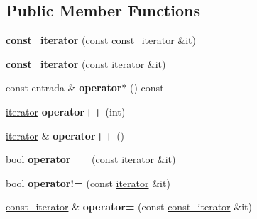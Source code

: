 \subsection*{Public Member Functions}
\begin{DoxyCompactItemize}
\item 
\hypertarget{classdiccionario_1_1const__iterator_a86b806648b2290cdba113a0e104ec03b}{{\bfseries const\-\_\-iterator} (const \hyperlink{classdiccionario_1_1const__iterator}{const\-\_\-iterator} \&it)}\label{classdiccionario_1_1const__iterator_a86b806648b2290cdba113a0e104ec03b}

\item 
\hypertarget{classdiccionario_1_1const__iterator_aefc3badb3cd84f14232a9bca4305ef3c}{{\bfseries const\-\_\-iterator} (const \hyperlink{classdiccionario_1_1iterator}{iterator} \&it)}\label{classdiccionario_1_1const__iterator_aefc3badb3cd84f14232a9bca4305ef3c}

\item 
\hypertarget{classdiccionario_1_1const__iterator_a54658c0f08be835e4af234eb707f6546}{const entrada \& {\bfseries operator$\ast$} () const }\label{classdiccionario_1_1const__iterator_a54658c0f08be835e4af234eb707f6546}

\item 
\hypertarget{classdiccionario_1_1const__iterator_a5d4f31080f7b4c3fd04e9196949340eb}{\hyperlink{classdiccionario_1_1iterator}{iterator} {\bfseries operator++} (int)}\label{classdiccionario_1_1const__iterator_a5d4f31080f7b4c3fd04e9196949340eb}

\item 
\hypertarget{classdiccionario_1_1const__iterator_aa8a7cac90bf31f45ceeb1e33a49e42f0}{\hyperlink{classdiccionario_1_1iterator}{iterator} \& {\bfseries operator++} ()}\label{classdiccionario_1_1const__iterator_aa8a7cac90bf31f45ceeb1e33a49e42f0}

\item 
\hypertarget{classdiccionario_1_1const__iterator_ae79a9f8f5f621f930f70149873a7ec19}{bool {\bfseries operator==} (const \hyperlink{classdiccionario_1_1iterator}{iterator} \&it)}\label{classdiccionario_1_1const__iterator_ae79a9f8f5f621f930f70149873a7ec19}

\item 
\hypertarget{classdiccionario_1_1const__iterator_a13335aea984507ad99d17181cdab52cb}{bool {\bfseries operator!=} (const \hyperlink{classdiccionario_1_1iterator}{iterator} \&it)}\label{classdiccionario_1_1const__iterator_a13335aea984507ad99d17181cdab52cb}

\item 
\hypertarget{classdiccionario_1_1const__iterator_a8be2889c50c551c574ce741fcfa576da}{\hyperlink{classdiccionario_1_1const__iterator}{const\-\_\-iterator} \& {\bfseries operator=} (const \hyperlink{classdiccionario_1_1const__iterator}{const\-\_\-iterator} \&it)}\label{classdiccionario_1_1const__iterator_a8be2889c50c551c574ce741fcfa576da}

\end{DoxyCompactItemize}
